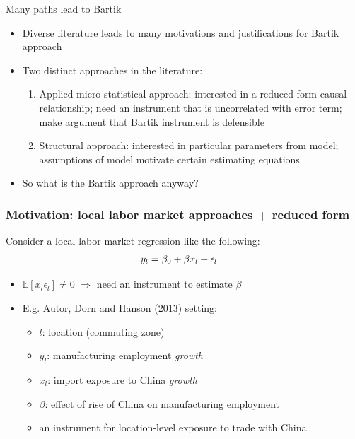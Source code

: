 \documentclass[notes,11pt, aspectratio=169]{beamer}
\begin{document}
\begin{frame}{Many paths lead to Bartik}
  \begin{itemize}
  \item Diverse literature leads to many motivations and justifications for Bartik approach
    \medskip
  \item Two distinct approaches in the literature:
    \begin{enumerate}
    \item Applied micro statistical approach: interested in a reduced
      form causal relationship; need an instrument that is
      uncorrelated with error term; make argument that Bartik
      instrument is defensible \smallskip
    \item Structural approach: interested in particular parameters
      from model; assumptions of model motivate certain estimating
      equations
    \end{enumerate}
    \medskip
  \item So what is the Bartik approach anyway?
  \end{itemize}
\end{frame}


\begin{frame}
  \frametitle{Motivation: local labor market approaches + reduced form}

  Consider a local labor market regression like the following:  
  \begin{align}
    y_l &= \beta_0 + \beta x_l + \epsilon_l \notag 
  \end{align}

  \begin{itemize}
    \setlength\itemsep{1em}
  \item $\mathbb{E}[x_l\epsilon_l] \neq 0$   $\Rightarrow$ need an instrument to estimate $\beta$ 
  \item E.g. Autor, Dorn and Hanson (2013) setting:
    \begin{itemize}
      \setlength\itemsep{1em}
    \item $l$: location (commuting zone)
    \item $y_l$: manufacturing employment \textit{growth}
    \item  $x_l$: import exposure to China \textit{growth}
    \item $\beta$: effect of rise of China on manufacturing employment
    \item an instrument for location-level exposure to trade with China
    \end{itemize}
\end{itemize}


\end{frame}
\end{document}
